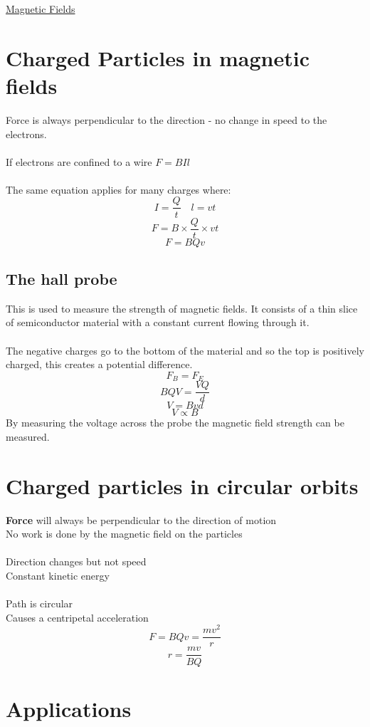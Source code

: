 \documentclass{article}[18pt]
\begin{document}
\begin{center}
\underline{\huge Magnetic Fields}
\end{center}
\section{Charged Particles in magnetic fields}
Force is always perpendicular to the direction - no change in speed to the electrons.\\
\\
If electrons are confined to a wire $F=BIl$\\
\\
The same equation applies for many charges where:
$$I=\frac{Q}{t} \quad l=vt$$
$$F=B\times\frac{Q}{t}\times vt$$
$$F=BQv$$
\subsection{The hall probe}
This is used to measure the strength of magnetic fields. It consists of a thin slice of semiconductor material with a constant current flowing through it.\\
\\
The negative charges go to the bottom of the material and so the top is positively charged, this creates a potential difference.
$$F_B=F_E$$
$$BQV=\frac{VQ}{d}$$
$$V=Bvd$$
$$V\propto B$$
By measuring the voltage across the probe the magnetic field strength can be measured.
\section{Charged particles in circular orbits}
\textbf{Force} will always be perpendicular to the direction of motion\\
No work is done by the magnetic field on the particles\\
\\
Direction changes but not speed\\
Constant kinetic energy\\
\\
Path is circular\\
Causes a centripetal acceleration\\
$$F=BQv=\dfrac{mv^2}{r}$$
$$r=\dfrac{mv}{BQ}$$
\newpage
\section{Applications}
\end{document}
